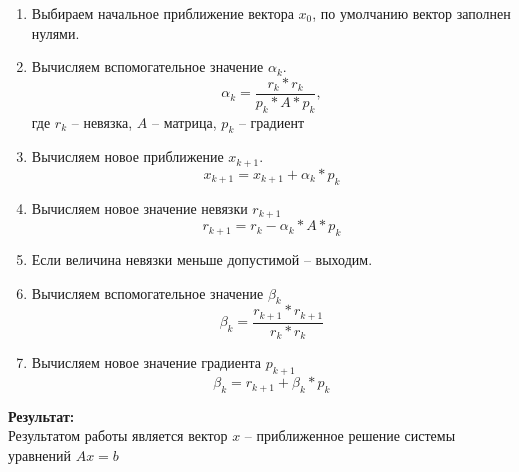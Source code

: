 \documentclass[14pt, russian]{extarticle}
\begin{document}
        \begin{enumerate}
            \item Выбираем начальное приближение вектора $x_{0}$, по умолчанию
            вектор заполнен нулями.
            \item Вычисляем вспомогательное значение $\alpha_{k}$.
                \begin{equation}
                    \alpha_{k} = \frac{r_{k} * r_{k}}{p_{k} * A * p_{k}},
                \end{equation}
                где $r_{k}$ – невязка, $A$ – матрица, $p_{k}$ – градиент
            \item Вычисляем новое приближение $x_{k+1}$.
                \begin{equation}
                    x_{k+1} = x_{k+1} + \alpha_{k} * p_{k}
                \end{equation}
            \item Вычисляем новое значение невязки $r_{k+1}$
                \begin{equation}
                    r_{k+1} = r_{k} - \alpha_{k} * A * p_{k}
                \end{equation}
            \item Если величина невязки меньше допустимой – выходим.
            \item Вычисляем вспомогательное значение $\beta_{k}$
                \begin{equation}
                    \beta_{k} = \frac{r_{k+1} * r_{k+1}}{r_{k} * r_{k}}
                \end{equation}
            \item Вычисляем новое значение градиента $p_{k+1}$
                \begin{equation}
                    \beta_{k} = r_{k + 1} + \beta_{k} * p_{k}
                \end{equation}
        \end{enumerate}
        {\noindent\textbf{Результат:}\\\indent}
        Результатом работы является вектор $x$ – приближенное решение системы уравнений $Ax = b$
        
        \newpage

\end{document}
